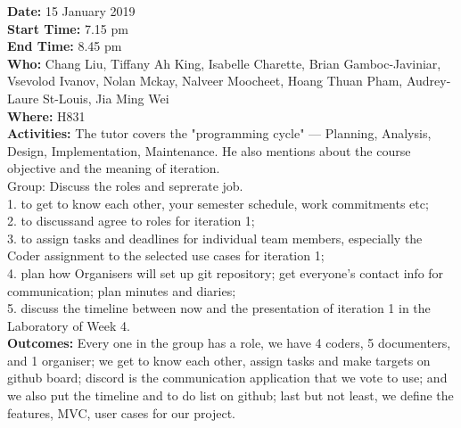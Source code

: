 \documentclass[12pt]{article}
\begin{document}
{\bf Date:} 15 January 2019\\
{\bf Start Time:} 7.15 pm\\
{\bf End Time:} 8.45 pm \\
{\bf Who:} Chang Liu, Tiffany Ah King, Isabelle Charette, Brian Gamboc-Javiniar, Vsevolod Ivanov, Nolan Mckay, Nalveer Moocheet, Hoang Thuan Pham, Audrey-Laure St-Louis, Jia Ming Wei\\
{\bf Where:} H831 \\
{\bf Activities:} The tutor covers the "programming cycle" --- Planning, Analysis, Design, Implementation, Maintenance. He also mentions about the course objective and the meaning of iteration.\\Group: Discuss the roles and seprerate job.\\ 1. to get to know each other, your semester schedule, work commitments etc;\\2. to discussand agree to roles for iteration 1;\\3. to assign tasks and deadlines for individual team members, especially the Coder assignment to the selected use cases for iteration 1;\\4. plan how Organisers will set up git repository; get everyone’s contact info for communication; plan minutes and diaries;\\
5. discuss the timeline between now and the presentation of iteration 1 in the Laboratory of
Week 4.\\
{\bf Outcomes:} Every one in the group has a role, we have 4 coders, 5 documenters, and 1 organiser; we get to know each other, assign tasks and make targets on github board; discord is the communication application that we vote to use; and we also put the timeline and to do list on github; last but not least, we define the features, MVC, user cases for our project.\\\\
\end{document}
